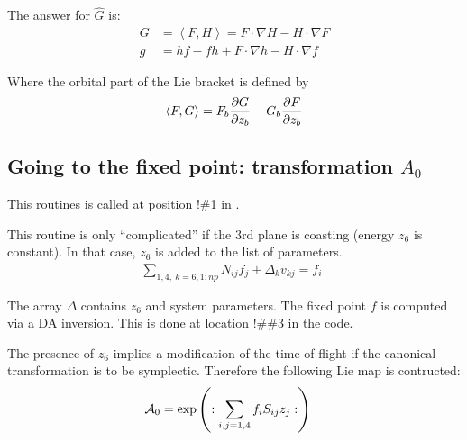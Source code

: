 \documentclass{hitec}     %
\begin{document}
{{{{{{The answer for $\widehat{G}$ is: 
%
\begin{align} G&= \left\langle{F,H}\right\rangle=
F\cdot \nabla H-H\cdot \nabla F\nonumber \\
 g&=hf-fh+F\cdot \nabla h-H\cdot \nabla f \label{liebra}\end{align}

Where the orbital part of the Lie bracket is defined by
%
\begin{align} \left\langle{F,G}\right\rangle=
{F}_{b}{\partial G \over \partial {z}_{b}}-{G}_{b}{\partial F \over \partial {z}_{b}} \label{eq:liebrac}\end{align}

%
\subsection{Going to the fixed point: transformation   $A_0$}\label{s:cgofix}

This routines is called at position !\#1 in .


This routine is only ``complicated'' if the 3rd plane is coasting (energy $z_6$ is constant).  In that case, $z_6$ is added to the list of parameters. 
%
\begin{align} \sum\limits_{1,4,\ k=
6,1:np}^{} {N}_{ij}{f}_{j}+{\Delta }_{k}{v}_{kj}=
{f}_{i}\ \ \label{etaform1} \end{align}

The array $\Delta$ contains $z_6$ and  system parameters. The fixed point $f$ is computed via a DA inversion. This is done at location !\#\#3 in the code.

The presence of $z_6$ implies a modification of the time of flight if the canonical transformation is to be symplectic.  Therefore the following Lie map is contructed:
%
\begin{align} {{\cal A}}_{0}&=\exp\left({:\sum\limits_{i,j=1,4}^{} {f}_{i}{S}_{ij}{z}_{j}:}\right)\label{tlie}\end{align}

}}}}}}
\end{document}
